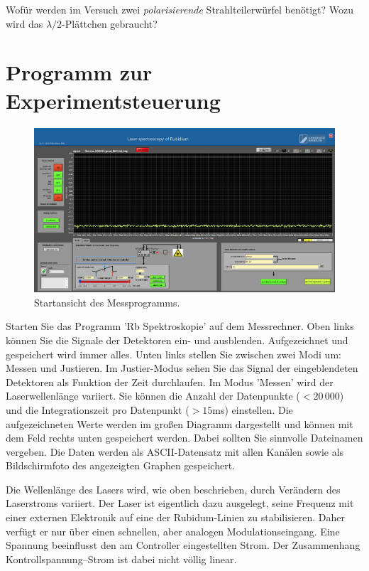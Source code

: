 \begin{questions}
	\item 	 Wofür werden im Versuch zwei \emph{polarisierende} Strahlteilerwürfel benötigt? Wozu wird das $\lambda/ 2$-Plättchen gebraucht?
\end{questions}

\section{Programm zur Experimentsteuerung}


\begin{figure}
	\includegraphics[width=\textwidth]{bilder/startansicht.png}
	\caption{Startansicht des Messprogramms.}
	\label{Startansicht Messprogramm}
\end{figure}


Starten Sie das Programm 'Rb Spektroskopie' auf dem Messrechner. Oben links können Sie die Signale der  Detektoren ein- und ausblenden. Aufgezeichnet und gespeichert wird immer alles. Unten links stellen Sie zwischen zwei Modi um: Messen und Justieren. Im Justier-Modus sehen Sie das Signal der eingeblendeten Detektoren als Funktion der Zeit durchlaufen. 
Im Modus 'Messen' wird der Laserwellenlänge variiert. Sie können die Anzahl der Datenpunkte ($< 20 \, 000$) und die Integrationszeit pro Datenpunkt ($> 15$ms) einstellen. Die aufgezeichneten Werte werden im großen Diagramm dargestellt und können mit dem Feld rechts unten gespeichert werden. Dabei sollten Sie sinnvolle Dateinamen vergeben. Die Daten werden als ASCII-Datensatz mit allen Kanälen sowie als Bildschirmfoto des angezeigten Graphen gespeichert.

Die Wellenlänge des Lasers wird, wie oben beschrieben, durch Verändern des Laserstroms variiert. Der Laser ist eigentlich dazu ausgelegt, seine Frequenz mit einer externen Elektronik auf eine der Rubidum-Linien zu stabilisieren. Daher verfügt er nur über einen schnellen, aber analogen Modulationseingang. Eine Spannung beeinflusst den am Controller eingestellten Strom. Der Zusammenhang Kontrollspannung--Strom ist dabei nicht völlig linear.

